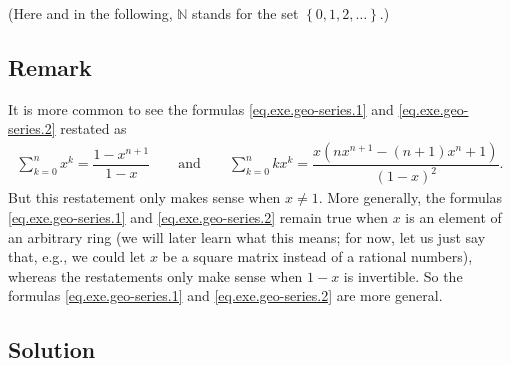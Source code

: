 \documentclass[paper=a4, fontsize=12pt]{scrartcl} %
\newcommand{\NN}{\mathbb{N}} %
\newcommand{\set}[1]{\left\{ #1 \right\}}
\newcommand{\tup}[1]{\left( #1 \right)}
\let\sumnonlimits\sum
\renewcommand{\sum}{\sumnonlimits\limits}
\theoremstyle{plainsl}
\theoremstyle{definition}
\theoremstyle{remark}
\begin{document}
(Here and in the following, $\NN$ stands for the set $\set{0, 1, 2, \ldots}$.)

\subsection{Remark}

It is more common to see the formulas
\eqref{eq.exe.geo-series.1} and \eqref{eq.exe.geo-series.2}
restated as
\begin{align*}
\sum_{k=0}^n x^k = \dfrac{1 - x^{n+1}}{1 - x}
\qquad
\text{and} \qquad
\sum_{k=0}^n k x^k
= \dfrac{x \tup{ n x^{n+1} - \tup{n+1} x^n + 1 }}{\tup{1 - x}^2} .
\end{align*}
But this restatement only makes sense when $x \neq 1$.
More generally, the formulas
\eqref{eq.exe.geo-series.1} and \eqref{eq.exe.geo-series.2}
remain true when $x$ is an element of an arbitrary ring
(we will later learn what this means; for now, let us
just say that, e.g., we could let $x$ be a square matrix
instead of a rational numbers), whereas the
restatements only make sense when $1 - x$ is invertible.
So the formulas
\eqref{eq.exe.geo-series.1} and \eqref{eq.exe.geo-series.2}
are more general.

\subsection{Solution}
\end{document}
